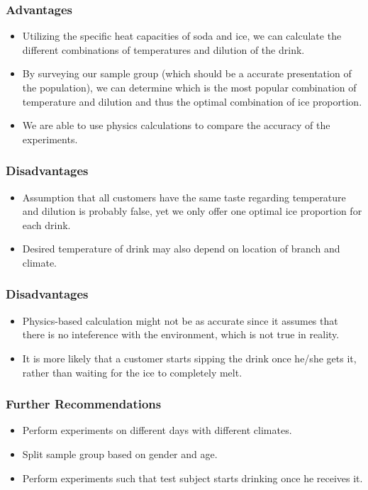 \documentclass[compress,handout,10pt]{beamer}
\let\olditem\item
\renewcommand{\item}{\setlength{\itemsep}{0.5\baselineskip}\olditem}
\begin{document}
\begin{frame}
    \frametitle{Advantages}

\begin {itemize}
\item Utilizing the specific heat capacities of soda and ice, we can calculate the different combinations of temperatures and dilution of the drink.
\item By surveying our sample group (which should be a accurate presentation of the population), we can determine which is the most popular combination of temperature and dilution and thus the optimal combination of ice proportion.
\item We are able to use physics calculations to compare the accuracy of the experiments.
\end{itemize}

\end{frame}

\begin{frame}
    \frametitle{Disadvantages}

\begin{itemize}
\item Assumption that all customers have the same taste regarding temperature and dilution is probably false, yet we only offer one optimal ice proportion for each drink.
\item Desired temperature of drink may also depend on location of branch and climate.

\end{itemize}

\end{frame}

\begin{frame}
    \frametitle{Disadvantages}

\begin{itemize}

\item Physics-based calculation might not be as accurate since it assumes that there is no inteference with the environment, which is not true in reality.
\item It is more likely that a customer starts sipping the drink once he/she gets it, rather than waiting for the ice to completely melt.
\end{itemize}

\end{frame}

\begin{frame}
    \frametitle{Further Recommendations}
\begin{itemize}
\item Perform experiments on different days with different climates.
\item Split sample group based on gender and age.
\item Perform experiments such that test subject starts drinking once he receives it.
\end{itemize}
\end{frame}
\end{document}
